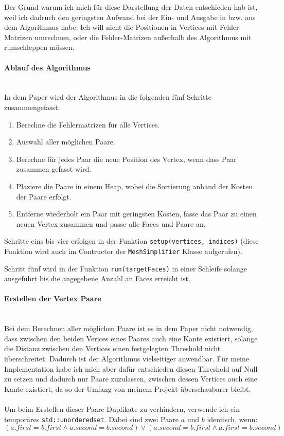 \documentclass[a4paper,12pt]{article}
\newcommand{\myparagraph}[1]{\paragraph*{#1}\mbox{}\\}
\begin{document}
Der Grund warum ich mich für diese Darstellung der Daten entschieden hab ist, weil ich dadruch den geringsten Aufwand bei der Ein- und Ausgabe in bzw. aus dem Algorithmus habe. 
Ich will nicht die Positionen in Vertices mit Fehler-Matrizen umrechnen, oder die Fehler-Matrizen außerhalb des Algorithmus mit rumschleppen müssen.

\myparagraph{Ablauf des Algorithmus}
In dem Paper wird der Algorithmus in die folgenden fünf Schritte zusammengefasst:

\begin{enumerate}
	\item Berechne die Fehlermatrizen für alle Vertices.
	\item Auswahl aller möglichen Paare.
	\item Berechne für jedes Paar die neue Position des Vertex, wenn dass Paar zusammen gefasst wird.
	\item Plaziere die Paare in einem Heap, wobei die Sortierung anhand der Kosten der Paare erfolgt.
	\item Entferne wiederholt ein Paar mit geringsten Kosten, fasse das Paar zu einen neuen Vertex zusammen und passe alle Faces und Paare an.
\end{enumerate}

Schritte eins bis vier erfolgen in der Funktion \texttt{setup(vertices, indices)} (diese Funktion wird auch im Contructor der \texttt{MeshSimplifier} Klasse aufgerufen).

Schritt fünf wird in der Funktion \texttt{run(targetFaces)} in einer Schleife solange ausgeführt bis die angegebene Anzahl an Faces erreicht ist.

\myparagraph{Erstellen der Vertex Paare}
Bei dem Berechnen aller möglichen Paare ist es in dem Paper nicht notwendig, dass zwischen den beiden Verices eines Paares auch eine Kante existiert, solange die Distanz zwischen den Vertices einen festgelegten Threshold nicht überschreitet. 
Dadurch ist der Algorithmus vielseitiger anwendbar.
Für meine Implementation habe ich mich aber dafür entschieden diesen Threshold auf Null zu setzen und dadurch nur Paare zuzulassen, zwischen dessen Vertices auch eine Kante existiert, da so der Umfang von meinem Projekt überschaubarer bleibt.
\\
\\
Um beim Erstellen dieser Paare Duplikate zu verhindern, verwende ich ein temporäres \texttt{std::unordered\textunderscore set}.
Dabei sind zwei Paare $a$ und $b$ identisch, wenn:
$$(a.first=b.first \land a.second=b.second) \lor (a.second=b.first \land a.first=b.second)$$
\end{document}
